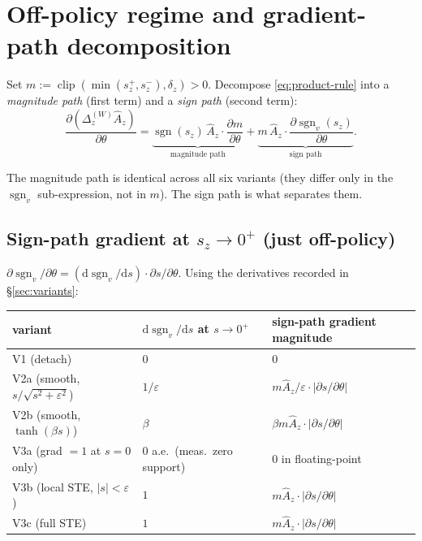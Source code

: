 \documentclass[11pt]{article}
\DeclareMathOperator*{\clip}{clip}
\DeclareMathOperator{\sign}{sgn}
\newcommand{\dif}{\mathrm{d}}
\begin{document}
\section{Off-policy regime and gradient-path decomposition}
\label{sec:offpolicy}

Set $m := \clip(\min(s_z^+, s_z^-), \delta_z) > 0$. Decompose
\eqref{eq:product-rule} into a \emph{magnitude path} (first term) and a
\emph{sign path} (second term):
\[
\frac{\partial (\Delta_z^{(W)} \hat A_z)}{\partial \theta}
= \underbrace{\sign(s_z)\,\hat A_z\cdot\frac{\partial m}{\partial \theta}}_{\text{magnitude path}}
+ \underbrace{m\,\hat A_z\cdot\frac{\partial \sign_v(s_z)}{\partial \theta}}_{\text{sign path}}.
\]

The magnitude path is identical across all six variants (they differ only
in the $\sign_v$ sub-expression, not in $m$). The sign path is what
separates them.

\subsection{Sign-path gradient at $s_z \to 0^+$ (just off-policy)}

$\partial\sign_v/\partial\theta = (\dif\sign_v/\dif s)\cdot\partial s/\partial\theta$.
Using the derivatives recorded in \S\ref{sec:variants}:

\begin{center}
\renewcommand{\arraystretch}{1.3}
\begin{tabular}{l l l}
\toprule
variant & $\dif\sign_v/\dif s$ at $s\to 0^+$ & sign-path gradient magnitude \\
\midrule
V1 (detach) & $0$ & $0$ \\
V2a (smooth, $s/\sqrt{s^2+\varepsilon^2}$) & $1/\varepsilon$ & $m\hat A_z / \varepsilon \cdot |\partial s/\partial\theta|$ \\
V2b (smooth, $\tanh(\beta s)$) & $\beta$ & $\beta m\hat A_z\cdot|\partial s/\partial\theta|$ \\
V3a (grad $=1$ at $s=0$ only) & $0$ a.e.\ (meas.~zero support) & $0$ in floating-point \\
V3b (local STE, $|s|<\varepsilon$) & $1$ & $m\hat A_z\cdot|\partial s/\partial\theta|$ \\
V3c (full STE) & $1$ & $m\hat A_z\cdot|\partial s/\partial\theta|$ \\
\bottomrule
\end{tabular}
\end{center}
\end{document}
